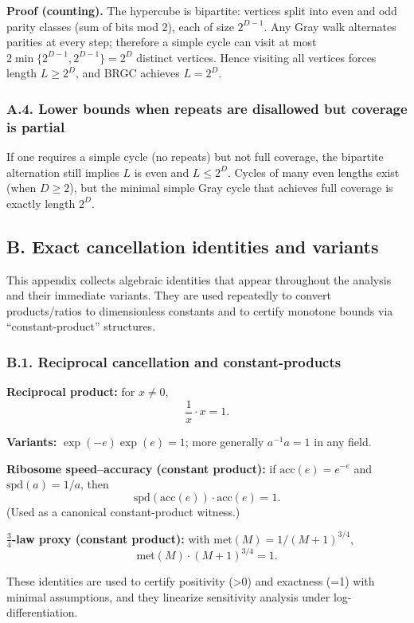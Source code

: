 \documentclass[12pt,a4paper]{article}
\theoremstyle{definition}
\theoremstyle{remark}
\begin{document}
\textbf{Proof (counting).} The hypercube is bipartite: vertices split into even and odd parity classes (sum of bits mod 2), each of size \(2^{D-1}\). Any Gray walk alternates parities at every step; therefore a simple cycle can visit at most \(2\min\{2^{D-1}, 2^{D-1}\} = 2^D\) distinct vertices. Hence visiting all vertices forces length \(L \geq 2^D\), and BRGC achieves \(L = 2^D\).

\subsubsection*{A.4. Lower bounds when repeats are disallowed but coverage is partial}

If one requires a simple cycle (no repeats) but not full coverage, the bipartite alternation still implies \(L\) is even and \(L \leq 2^D\). Cycles of many even lengths exist (when \(D \geq 2\)), but the minimal simple Gray cycle that achieves full coverage is exactly length \(2^D\).

\subsection*{B. Exact cancellation identities and variants}

This appendix collects algebraic identities that appear throughout the analysis and their immediate variants. They are used repeatedly to convert products/ratios to dimensionless constants and to certify monotone bounds via ``constant-product'' structures.

\subsubsection*{B.1. Reciprocal cancellation and constant-products}

\textbf{Reciprocal product:} for \(x \neq 0\),
$$\frac{1}{x} \cdot x = 1.$$

\textbf{Variants:} \(\exp(-e)\exp(e) = 1\); more generally \(a^{-1}a = 1\) in any field.

\textbf{Ribosome speed--accuracy (constant product):} if \(\text{acc}(e) = e^{-e}\) and \(\text{spd}(a) = 1/a\), then
$$\text{spd}(\text{acc}(e)) \cdot \text{acc}(e) = 1.$$
(Used as a canonical constant-product witness.)

\textbf{\(\frac{3}{4}\)-law proxy (constant product):} with \(\text{met}(M) = 1/(M+1)^{3/4}\),
$$\text{met}(M) \cdot (M+1)^{3/4} = 1.$$

These identities are used to certify positivity (>0) and exactness (=1) with minimal assumptions, and they linearize sensitivity analysis under log-differentiation.
\end{document}
